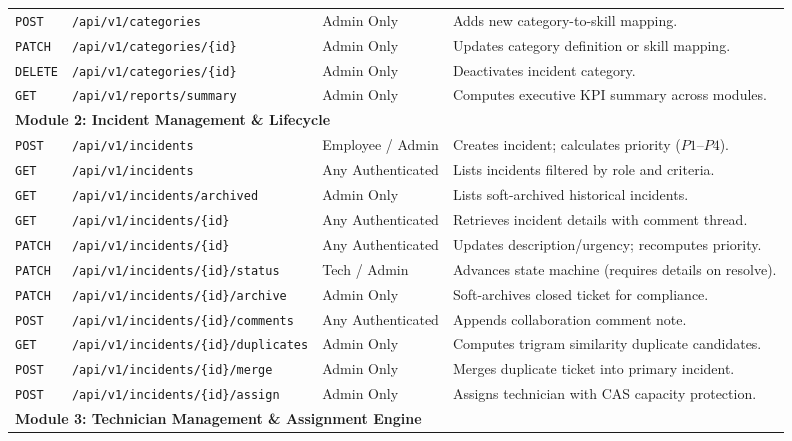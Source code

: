 \documentclass[11pt,a4paper,oneside]{report}
\begin{document}
\begin{table}[H]
\begin{tabular}{p{1.2cm}p{5.5cm}p{2.5cm}p{5.0cm}}
\texttt{POST} & \texttt{/api/v1/categories} & Admin Only & Adds new category-to-skill mapping. \\
\texttt{PATCH} & \texttt{/api/v1/categories/\{id\}} & Admin Only & Updates category definition or skill mapping. \\
\texttt{DELETE} & \texttt{/api/v1/categories/\{id\}} & Admin Only & Deactivates incident category. \\
\texttt{GET} & \texttt{/api/v1/reports/summary} & Admin Only & Computes executive KPI summary across modules. \\
\midrule
\multicolumn{4}{l}{\textbf{Module 2: Incident Management \& Lifecycle}} \\
\midrule
\texttt{POST} & \texttt{/api/v1/incidents} & Employee / Admin & Creates incident; calculates priority ($P1$--$P4$). \\
\texttt{GET} & \texttt{/api/v1/incidents} & Any Authenticated & Lists incidents filtered by role and criteria. \\
\texttt{GET} & \texttt{/api/v1/incidents/archived} & Admin Only & Lists soft-archived historical incidents. \\
\texttt{GET} & \texttt{/api/v1/incidents/\{id\}} & Any Authenticated & Retrieves incident details with comment thread. \\
\texttt{PATCH} & \texttt{/api/v1/incidents/\{id\}} & Any Authenticated & Updates description/urgency; recomputes priority. \\
\texttt{PATCH} & \texttt{/api/v1/incidents/\{id\}/status} & Tech / Admin & Advances state machine (requires details on resolve). \\
\texttt{PATCH} & \texttt{/api/v1/incidents/\{id\}/archive} & Admin Only & Soft-archives closed ticket for compliance. \\
\texttt{POST} & \texttt{/api/v1/incidents/\{id\}/comments} & Any Authenticated & Appends collaboration comment note. \\
\texttt{GET} & \texttt{/api/v1/incidents/\{id\}/duplicates}& Admin Only & Computes trigram similarity duplicate candidates. \\
\texttt{POST} & \texttt{/api/v1/incidents/\{id\}/merge} & Admin Only & Merges duplicate ticket into primary incident. \\
\texttt{POST} & \texttt{/api/v1/incidents/\{id\}/assign} & Admin Only & Assigns technician with CAS capacity protection. \\
\midrule
\multicolumn{4}{l}{\textbf{Module 3: Technician Management \& Assignment Engine}} \\

\end{tabular}
\end{table}
\end{document}
